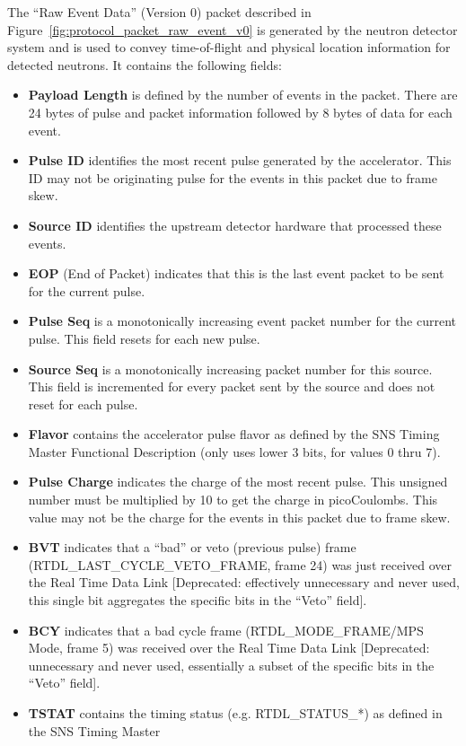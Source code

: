 The ``Raw Event Data'' (Version 0) packet described in
Figure~\ref{fig:protocol_packet_raw_event_v0} is generated by the neutron
detector system and is used to convey time-of-flight and physical location
information for detected neutrons. It contains the following fields:
\begin{itemize}
\item{\bf Payload Length} is defined by the number of events in the packet.
There are 24 bytes of pulse and packet information followed by 8 bytes of
data for each event.
\item{\bf Pulse ID} identifies the most recent pulse generated by the
accelerator. This ID may not be originating pulse for the events
in this packet due to frame skew.
\item{\bf Source ID} identifies the upstream detector hardware that
processed these events.
\item{\bf EOP} (End of Packet) indicates that this is the last event packet
to be sent for the current pulse.
\item{\bf Pulse Seq} is a monotonically increasing event packet number
for the current pulse.
This field resets for each new pulse.
\item{\bf Source Seq} is a monotonically increasing packet number
for this source.
This field is incremented for every packet sent by the source and does not
reset for each pulse.
\item{\bf Flavor} contains the accelerator pulse flavor as defined by
the SNS Timing Master Functional Description
(only uses lower 3 bits, for values 0 thru 7).
\item{\bf Pulse Charge} indicates the charge of the most recent pulse. This
unsigned number must be multiplied by 10 to get the charge in picoCoulombs. This
value may not be the charge for the events in this packet due to frame skew.
\item{\bf BVT} indicates that a ``bad'' or veto (previous pulse) frame
(RTDL\_LAST\_CYCLE\_VETO\_FRAME, frame 24) was just received over the
Real Time Data Link [Deprecated: effectively unnecessary and never used,
this single bit aggregates the specific bits in the ``Veto'' field].
\item{\bf BCY} indicates that a bad cycle frame
(RTDL\_MODE\_FRAME/MPS Mode, frame 5) was received over the
Real Time Data Link
[Deprecated: unnecessary and never used, essentially a subset of the
specific bits in the ``Veto'' field].
\item{\bf TSTAT} contains the timing status
(e.g. RTDL\_STATUS\_*) as defined in the SNS Timing Master

\end{itemize}
